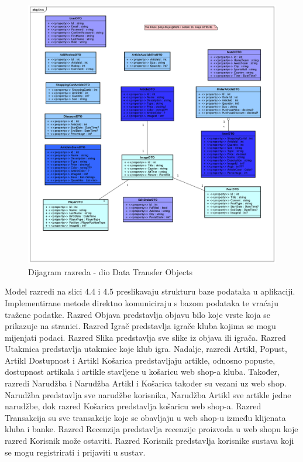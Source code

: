 		\begin{figure}[H]
			\includegraphics[width=\linewidth]{dijagrami/Dijagram_DTO.png}
			\centering
			\caption{Dijagram razreda - dio Data Transfer Objects}
			\label{fig:ClassDiagram1}
		\end{figure}
		
			\textnormal{Model razredi na slici 4.4 i 4.5 preslikavaju strukturu baze podataka u aplikaciji. Implementirane metode direktno komuniciraju s bazom podataka te vraćaju tražene podatke. Razred Objava predstavlja objavu bilo koje vrste koja se prikazuje na stranici. Razred Igrač predstavlja igrače kluba kojima se mogu mijenjati podaci. Razred Slika predstavlja sve slike iz objava ili igrača. Razred Utakmica predstavlja utakmice koje klub igra. Nadalje, razredi Artikl, Popust, Artikl Dostupnost i Artikl Košarica predstavljaju artikle, odnosno popuste, dostupnost artikala i artikle stavljene u košaricu web shop-a kluba. Također, razredi Narudžba i Narudžba Artikl i Košarica također su vezani uz web shop. Narudžba predstavlja sve narudžbe korisnika, Narudžba Artikl sve artikle jedne narudžbe, dok razred Košarica predstavlja košaricu web shop-a. Razred Transakcija su sve transakcije koje se obavljaju u web shop-u između klijenata kluba i banke. Razred Recenzija predstavlja recenzije proizvoda u web shopu koje razred Korisnik može ostaviti. Razred Korisnik predstavlja korisnike sustava koji se mogu registrirati i prijaviti u sustav.}\\
		
